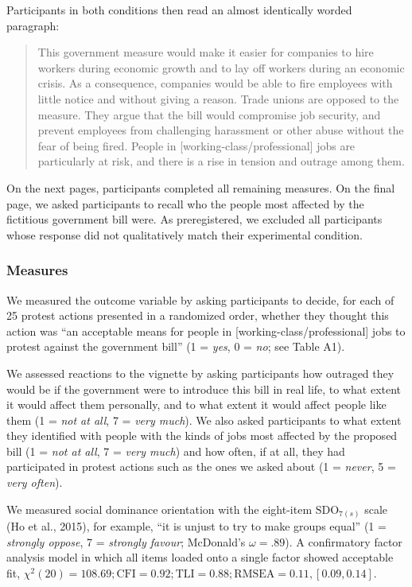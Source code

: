 \documentclass[12pt, letterpaper]{article}
\begin{document}
\noindent Participants in both conditions then read an almost
identically worded paragraph:

\begin{quote}
This government measure would make it easier for companies to hire
workers during economic growth and to lay off workers during an economic
crisis. As a consequence, companies would be able to fire employees with
little notice and without giving a reason. Trade unions are opposed to
the measure. They argue that the bill would compromise job security, and
prevent employees from challenging harassment or other abuse without the
fear of being fired. People in {[}working-class/professional{]} jobs are
particularly at risk, and there is a rise in tension and outrage among
them.
\end{quote}

On the next pages, participants completed all remaining measures. On the
final page, we asked participants to recall who the people most affected
by the fictitious government bill were. As preregistered, we excluded
all participants whose response did not qualitatively match their
experimental condition.

\hypertarget{measures}{%
\subsubsection{Measures}\label{measures}}

We measured the outcome variable by asking participants to decide, for
each of 25 protest actions presented in a randomized order, whether they
thought this action was ``an acceptable means for people in
{[}working-class/professional{]} jobs to protest against the government
bill'' (1 = \emph{yes}, 0 = \emph{no}; see Table A1).

We assessed reactions to the vignette by asking participants how
outraged they would be if the government were to introduce this bill in
real life, to what extent it would affect them personally, and to what
extent it would affect people like them (1 = \emph{not at all}, 7 =
\emph{very much}). We also asked participants to what extent they
identified with people with the kinds of jobs most affected by the
proposed bill (1 = \emph{not at all}, 7 = \emph{very much}) and how
often, if at all, they had participated in protest actions such as the
ones we asked about (1 = \emph{never}, 5 = \emph{very often}).

We measured social dominance orientation with the eight-item
\(\text{SDO}_{7(s)}\) scale (Ho et al., 2015), for example, ``it is
unjust to try to make groups equal'' (1 = \emph{strongly oppose}, 7 =
\emph{strongly favour}; McDonald's \(\omega = .89\)). A confirmatory
factor analysis model in which all items loaded onto a single factor
showed acceptable fit,
\(\chi^2 (20) = 108.69; \text{CFI} = 0.92; \text{TLI} = 0.88; \text{RMSEA} = 0.11, [0.09, 0.14]\).
\end{document}

